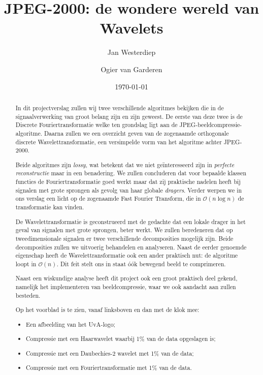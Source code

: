 \documentclass[11pt]{uvamath}
\title{JPEG-2000: de wondere wereld van Wavelets}
\date{\today}
\author[10219242, janner@gmail.com]{Jan Westerdiep}
\author[10191429, ogiervangarderen@gmail.com]{Ogier van Garderen}
\theoremstyle{plain}
\theoremstyle{definition}
\theoremstyle{remark}
\begin{document}
\maketitle

\begin{abstract}
In dit projectverslag zullen wij twee verschillende algoritmes bekijken die in de signaalverwerking van groot belang zijn en zijn geweest. De eerste van deze twee is de Discrete Fouriertransformatie welke ten grondslag ligt aan de JPEG-beeldcompressie-algoritme. Daarna zullen we een overzicht geven van de zogenaamde orthogonale discrete Wavelettransformatie, een versimpelde vorm van het algoritme achter JPEG-2000.

Beide algoritmes zijn \emph{lossy}, wat betekent dat we niet ge\"interesseerd zijn in \emph{perfecte reconstructie} maar in een benadering. We zullen concluderen dat voor bepaalde klassen functies de Fouriertransformatie goed werkt maar dat zij praktische nadelen heeft bij signalen met grote sprongen als gevolg van haar globale \emph{dragers}. Verder werpen we in ons verslag een licht op de zogenaamde Fast Fourier Transform, die in $\mathcal{O}(n \log n)$ de transformatie kan vinden.

De Wavelettransformatie is geconstrueerd met de gedachte dat een lokale drager in het geval van signalen met grote sprongen, beter werkt. We zullen beredeneren dat op tweedimensionale signalen er twee verschillende decomposities mogelijk zijn. Beide decomposities zullen we uitvoerig behandelen en analyseren. Naast de eerder genoemde eigenschap heeft de Wavelettransformatie ook een ander praktisch nut: de algoritme loopt in $\mathcal{O}(n)$. Dit  feit stelt ons in staat \'o\'ok bewegend beeld te comprimeren. 

Naast een wiskundige analyse heeft dit project ook een groot praktisch deel gekend, namelijk het implementeren
van beeldcompressie, waar we ook aandacht aan zullen besteden.

Op het voorblad is te zien, vanaf linksboven en dan met de klok mee:
\begin{itemize}
	\setlength{\itemsep}{-10pt}
	\item Een afbeelding van het UvA-logo;
	\item Compressie met een Haarwavelet waarbij 1\% van de data opgeslagen is;
	\item Compressie met een Daubechies-2 wavelet met 1\% van de data;
	\item Compressie met een Fouriertransformatie met 1\% van de data.
\end{itemize}
\end{abstract}
\end{document}
